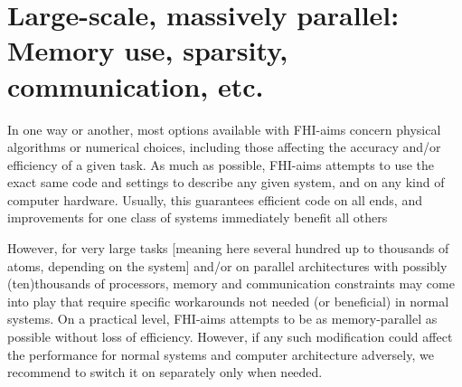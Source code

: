 \section{Large-scale, massively parallel: Memory
  use, sparsity, communication, etc.} 

In one way or another, most options available with FHI-aims concern
physical algorithms or numerical choices, including those affecting
the accuracy and/or efficiency of a given task. As much as possible,
FHI-aims attempts to use the exact same code and settings to describe
any given system, and on any kind of computer hardware. Usually, this
guarantees efficient code on all ends, and improvements for one class
of systems immediately benefit all others

However, for very large tasks [meaning here several hundred
up to thousands of atoms, depending on the system] and/or on parallel
architectures with possibly (ten)thousands of processors, memory and
communication constraints may come into play that require specific
workarounds not needed (or beneficial) in normal systems. On a
practical level, FHI-aims 
attempts to be as memory-parallel as possible without loss of
efficiency. However, if any such modification could affect the
performance for normal systems and computer architecture adversely, we
recommend to switch it on separately only when needed.

